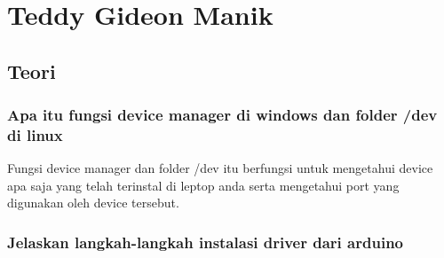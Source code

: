 \section{Teddy Gideon Manik}
\subsection{Teori}
\subsubsection{Apa itu fungsi device manager di windows dan folder /dev di linux}
Fungsi device manager dan folder /dev itu berfungsi untuk mengetahui device apa saja yang telah terinstal di leptop anda serta mengetahui port yang digunakan oleh device tersebut.

\subsubsection{Jelaskan langkah-langkah instalasi driver dari arduino}
